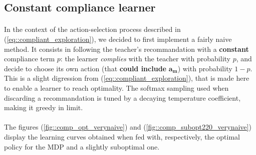 \documentclass[a4paper]{report}
\begin{document}
{{		\subsection{Constant compliance learner}
		{
			\paragraph{} In the context of the action-selection process described in (\ref{eq::compliant_exploration}), we decided to first implement a fairly naive method. It consists in following the teacher's recommandation with a \textbf{constant} compliance term $p$: the learner \emph{complies} with the teacher with probability $p$, and decide to choose its own action (that \textbf{could include} $\boldsymbol{a_m}$) with probability $1-p$. This is a slight digression from (\ref{eq::compliant_exploration}), that is made here to enable a learner to reach optimality. The softmax sampling used when discarding a recommandation is tuned by a decaying temperature coefficient, making it greedy in limit.
			
			\paragraph{} The figures (\ref{fig::comp_opt_verynaive}) and (\ref{fig::comp_subopt220_verynaive}) display the learning curves obtained when fed with, respectively, the optimal policy for the MDP and a slightly suboptimal one. 
			
}}}
\end{document}
